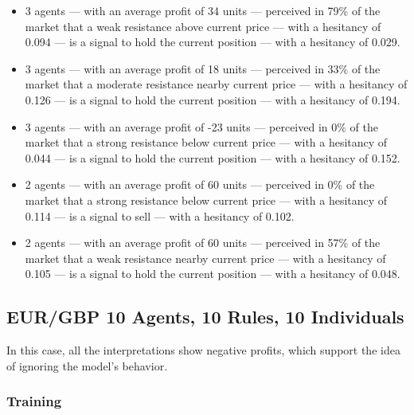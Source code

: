 {\small
  \begin{itemize}
  \item 3 agents — with an average profit of 34 units — perceived in 79\% of the
    market that a weak resistance above current price — with a hesitancy of
    0.094 — is a signal to hold the current position — with a hesitancy of
    0.029.
  \item 3 agents — with an average profit of 18 units — perceived in 33\% of the
    market that a moderate resistance nearby current price — with a hesitancy of
    0.126 — is a signal to hold the current position — with a hesitancy of
    0.194.
  \item 3 agents — with an average profit of -23 units — perceived in 0\% of the
    market that a strong resistance below current price — with a hesitancy of
    0.044 — is a signal to hold the current position — with a hesitancy of
    0.152.
  \item 2 agents — with an average profit of 60 units — perceived in 0\% of the
    market that a strong resistance below current price — with a hesitancy of
    0.114 — is a signal to sell — with a hesitancy of 0.102.
  \item 2 agents — with an average profit of 60 units — perceived in 57\% of the
    market that a weak resistance nearby current price — with a hesitancy of
    0.105 — is a signal to hold the current position — with a hesitancy of
    0.048.
  \end{itemize}
}

\subsection{EUR/GBP 10 Agents, 10 Rules, 10 Individuals}
\label{results:interpretation-eur-gbp-10agents-10rules-10individuals}

In this case, all the interpretations show negative profits, which support the
idea of ignoring the model's behavior.

\subsubsection{Training}

